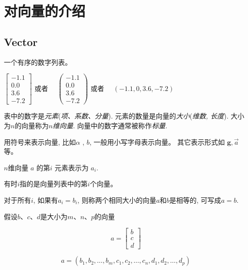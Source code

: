 \chapter{对向量的介绍}

\section{Vector}

\begin{definition}[Vector]
    一个有序的数字列表。

    \( \left[\begin{array}{c}-1.1 \\ 0.0 \\ 3.6 \\ -7.2\end{array}\right] \) 或者 \( \quad\left(\begin{array}{c}-1.1 \\ 0.0 \\ 3.6 \\ -7.2\end{array}\right) \) 或者 \( \quad(-1.1,0,3.6,-7.2) \)
\end{definition}

表中的数字是\textit{元素}(\textit{项、系数、分量}). 元素的数量是向量的\textit{大小}(\textit{维数, 长度}). 大小为$n$的向量称为\textit{$n$维向量}. 
向量中的数字通常被称作\textit{标量}. 

用符号来表示向量, 比如$\alpha$ , $b$, 一般用小写字母表示向量。 其它表示形式如 $\boldsymbol{g}, \vec{a}$ 等。

\begin{definition}[n维向量 \( a \) 的第 \( i \) 元素]
    $n$维向量 \( a \) 的第\( i \) 元素表示为 \( a_{i} \).

    有时$i$指的是向量列表中的第$i$个向量。
\end{definition}

\begin{definition}[$a=b$]
    对于所有$i$, 如果有$a_i = b_i$, 则称两个相同大小的向量$a$和$b$是相等的, 可写成$a = b$.
\end{definition}

\begin{definition}
    假设$b$、$c$、$d$是大小为$m$、$n$、$p$的向量
    
    $$ a=\left[\begin{array}{l}b \\ c \\ d\end{array}\right] $$

    $$ a=\left(b_{1}, b_{2}, \ldots, b_{m}, c_{1}, c_{2}, \ldots, c_{n}, d_{1}, d_{2}, \ldots, d_{p}\right) $$
\end{definition}


